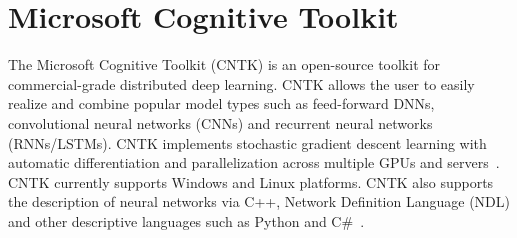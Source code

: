 \section{Microsoft Cognitive Toolkit}

The Microsoft Cognitive Toolkit (CNTK) is an open-source toolkit for commercial-grade distributed deep learning. CNTK allows the user to easily realize and combine popular model types such as feed-forward DNNs, convolutional neural networks (CNNs) and recurrent neural networks (RNNs/LSTMs). CNTK implements stochastic gradient descent learning with automatic differentiation and parallelization across multiple GPUs and servers~\cite{hid-sp18-510-web-cntk}. CNTK currently supports Windows and Linux platforms. CNTK also supports the description of neural networks via C++, Network Definition Language (NDL) and other descriptive languages such as Python and C\#~\cite{hid-sp18-510-kd-cntk}.

